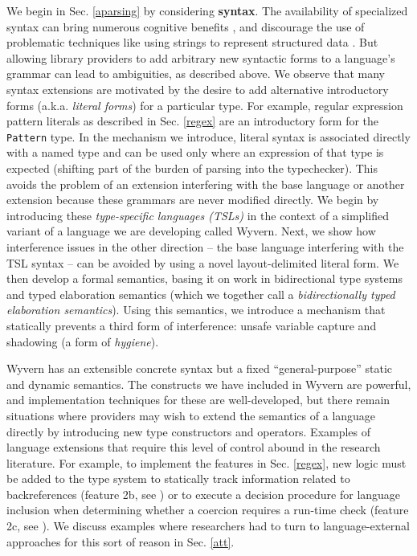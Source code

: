 We begin in Sec. \ref{aparsing} by considering \textbf{syntax}. The availability of specialized syntax can bring numerous cognitive benefits \cite{green1996usability}, and discourage the use of problematic techniques like using strings to represent structured data \cite{Bravenboer:2007:PIA:1289971.1289975}. But allowing library providers to add arbitrary new syntactic forms to a language's grammar can lead to ambiguities, as described above. We observe that many syntax extensions are motivated by the desire to add alternative  introductory forms (a.k.a. \emph{literal forms}) for a particular type. For example, regular expression pattern literals as described in Sec. \ref{regex} are an introductory form for the \verb|Pattern| type.  In the mechanism we introduce, literal syntax is associated directly with a named type and can be used only where an expression of that type is expected (shifting part of the burden of parsing into the typechecker). This avoids the problem of an extension interfering with the base language or another extension  because these grammars are never modified directly. We begin by introducing these \emph{type-specific languages (TSLs)} in the context of a simplified variant of a language we are developing called Wyvern. Next, we show how interference issues in the other direction -- the base language interfering with  the TSL syntax -- can be avoided by using a novel layout-delimited literal form. We then develop a formal semantics, basing it on work in bidirectional type systems and typed elaboration semantics (which we together call a \emph{bidirectionally typed elaboration semantics}). Using this semantics, we introduce a mechanism that statically prevents a third form of interference: unsafe variable capture and shadowing (a form of \emph{hygiene}).%

Wyvern has an extensible concrete syntax but a fixed ``general-purpose'' static and dynamic semantics. The  constructs we have included in Wyvern are powerful, and implementation techniques for these are well-developed, but there remain situations where providers may wish to extend the {semantics} of a language directly by introducing new type constructors and operators. Examples of language extensions that require this level of control abound in the research literature. For example, to implement the features in Sec. \ref{regex}, new logic must be added to the type system to statically track information related to backreferences (feature 2b, see \cite{spishak2012type}) or to execute a decision procedure for language inclusion when determining whether a coercion requires a run-time check (feature 2c, see \cite{fulton-thesis,HosoyaVouillonPierce2000ICFP}). We discuss examples where researchers had to turn to language-external approaches for this sort of reason in Sec. \ref{att}. 

